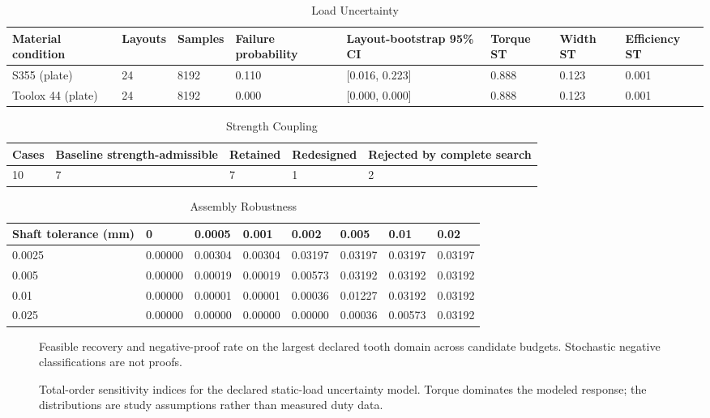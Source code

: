 \documentclass[preprint,12pt]{elsarticle}
\begin{document}
\begin{table}[htbp]
\centering
\caption{Load Uncertainty}
\small
\begin{tabular}{llllllll}
\textbf{Material condition} & \textbf{Layouts} & \textbf{Samples} & \textbf{Failure probability} & \textbf{Layout-bootstrap 95\% CI} & \textbf{Torque ST} & \textbf{Width ST} & \textbf{Efficiency ST} \\
\hline
S355 (plate) & 24 & 8192 & 0.110 & [0.016, 0.223] & 0.888 & 0.123 & 0.001 \\
Toolox 44 (plate) & 24 & 8192 & 0.000 & [0.000, 0.000] & 0.888 & 0.123 & 0.001 \\
\end{tabular}
\end{table}
\begin{table}[htbp]
\centering
\caption{Strength Coupling}
\small
\begin{tabular}{lllll}
\textbf{Cases} & \textbf{Baseline strength-admissible} & \textbf{Retained} & \textbf{Redesigned} & \textbf{Rejected by complete search} \\
\hline
10 & 7 & 7 & 1 & 2 \\
\end{tabular}
\end{table}
\begin{table}[htbp]
\centering
\caption{Assembly Robustness}
\small
\begin{tabular}{llllllll}
\textbf{Shaft tolerance (mm)} & \textbf{0} & \textbf{0.0005} & \textbf{0.001} & \textbf{0.002} & \textbf{0.005} & \textbf{0.01} & \textbf{0.02} \\
\hline
0.0025 & 0.00000 & 0.00304 & 0.00304 & 0.03197 & 0.03197 & 0.03197 & 0.03197 \\
0.005 & 0.00000 & 0.00019 & 0.00019 & 0.00573 & 0.03192 & 0.03192 & 0.03192 \\
0.01 & 0.00000 & 0.00001 & 0.00001 & 0.00036 & 0.01227 & 0.03192 & 0.03192 \\
0.025 & 0.00000 & 0.00000 & 0.00000 & 0.00000 & 0.00036 & 0.00573 & 0.03192 \\
\end{tabular}
\end{table}
\begin{figure}[htbp]
\centering

\caption{Feasible recovery and negative-proof rate on the largest declared tooth domain across candidate budgets. Stochastic negative classifications are not proofs.}
\end{figure}
\begin{figure}[htbp]
\centering

\caption{Total-order sensitivity indices for the declared static-load uncertainty model. Torque dominates the modeled response; the distributions are study assumptions rather than measured duty data.}
\end{figure}
\end{document}
